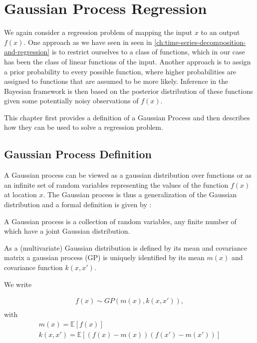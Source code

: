 \chapter{Gaussian Process Regression}\label{ch:gaussian-process-regression}


We again consider a regression problem of mapping the input $x$ to an output $f(x)$.
One approach as we have seen in seen in \ref{ch:time-series-decomposition-and-regression}
is to restrict ourselves to a
class of functions, which in our case has been the class of linear functions of the input.
Another approach is to assign a prior probability to every possible function, where higher
probabilities are assigned to functions that are assumed to be more likely.
Inference in the Bayesian framework is then based on the posterior distribution of these
functions given some potentially noisy observations of $f(x)$.

This chapter first provides a definition of a Gaussian Process and then describes how they
can be used to solve a regression problem.

\section{Gaussian Process Definition}

A Gaussian process can be viewed as a gaussian distribution over functions or as an infinite set of random
variables representing the values of the function $f(x)$ at location $x$.
The Gaussian process is thus a generalization of the Gaussian distribution and a formal definition is given
by \citeauthor{rasmussen_gaussian_2006} :

\begin{definition}\label{def:GP}
 A Gaussian process is a collection of random variables, any finite number of which have a joint Gaussian distribution.
\end{definition}


As a (multivariate) Gaussian distribution is defined by its mean and covariance matrix a gaussian process (GP) is
uniquely identified by its mean $m(x)$ and covariance function $k(x,x')$.

We write

\begin{gather}
    f(x) \sim GP(m(x), k(x,x')), \\
\end{gather}
with
\begin{gather}
    m(x) = \mathbb{E}[f(x)] \\
    k(x,x') = \mathbb{E}[(f(x)-m(x))(f(x')-m(x'))]
\end{gather}

